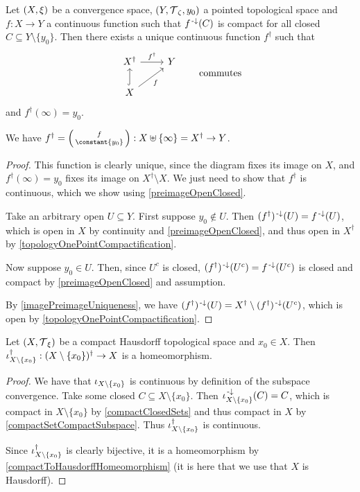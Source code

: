 \begin{proposition} \label{universalPropertyAlexandroffCompactification}
Let $\sSet{X, \xi}$ be a convergence space, $\sSet{Y,\topology_\zeta, y_0}$ a pointed topological space and $f: X\to Y$ a continuous function such that $f^{\text{\hspace{0.15em}-}\downarrow}(C)$ is compact for all closed $C\subseteq Y\setminus\{y_0\}$. Then there exists a unique continuous function $f^\dagger$ such that
\[ \begin{tikzcd}
X^\dagger \ar[r, "{f^\dagger}"] & Y \\
X \ar[u, hook] \ar[ur, swap, "f"]
\end{tikzcd} \qquad \text{commutes} \]
and $f^\dagger(\infty) = y_0$.
\end{proposition}
We have $f^\dagger = \left(\begin{smallmatrix}
f \\ \constant{y_0}
\end{smallmatrix}\right): X\uplus \{\infty\} = X^\dagger \to Y$.
\begin{proof}
This function is clearly unique, since the diagram fixes its image on $X$, and $f^\dagger(\infty) = y_0$ fixes its image on $X^\dagger \setminus X$. We just need to show that $f^\dagger$ is continuous, which we show using \ref{preimageOpenClosed}.

Take an arbitrary open $U\subseteq Y$. First suppose $y_0\notin U$. Then $(f^\dagger)^{\text{\hspace{0.15em}-}\downarrow}(U) = f^{\text{\hspace{0.15em}-}\downarrow}(U)$, which is open in $X$ by continuity and \ref{preimageOpenClosed}, and thus open in $X^\dagger$ by \ref{topologyOnePointCompactification}.

Now suppose $y_0\in U$. Then, since $U^c$ is closed, $(f^\dagger)^{{\text{\hspace{0.15em}-}\downarrow}}(U^c) = f^{\text{\hspace{0.15em}-}\downarrow}(U^c)$ is closed and compact by \ref{preimageOpenClosed} and assumption.

By \ref{imagePreimageUniqueness}, we have $(f^\dagger)^{\text{\hspace{0.15em}-}\downarrow}(U) = X^\dagger \setminus (f^\dagger)^{\text{\hspace{0.15em}-}\downarrow}(U^c)$, which is open by \ref{topologyOnePointCompactification}.
\end{proof}
\begin{corollary}
Let $\sSet{X,\topology_\xi}$ be a compact Hausdorff topological space and $x_0\in X$. Then $\operatorname{\iota}_{X\setminus\{x_0\}}^\dagger: (X\setminus\{x_0\})^\dagger\to X$ is a homeomorphism.
\end{corollary}
\begin{proof}
We have that $\operatorname{\iota}_{X\setminus\{x_0\}}$ is continuous by definition of the subspace convergence. Take some closed $C\subseteq X\setminus\{x_0\}$. Then $\operatorname{\iota}_{X\setminus\{x_0\}}^{{\text{\hspace{0.15em}-}\downarrow}}(C) = C$, which is compact in $X\setminus\{x_0\}$ by \ref{compactClosedSets} and thus compact in $X$ by \ref{compactSetCompactSubspace}. Thus $\operatorname{\iota}_{X\setminus\{x_0\}}^\dagger$ is continuous.

Since $\operatorname{\iota}_{X\setminus\{x_0\}}^\dagger$ is clearly bijective, it is a homeomorphism by \ref{compactToHausdorffHomeomorphism} (it is here that we use that $X$ is Hausdorff).
\end{proof}

